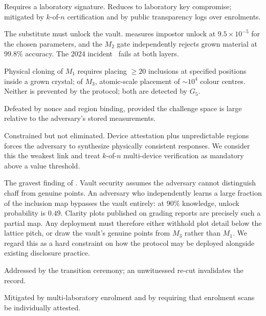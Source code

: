 \documentclass[10pt,twocolumn]{article}
\theoremstyle{remark}
\begin{document}
\begin{description}[leftmargin=1.4em,style=nextline]
\item[$A_1$ Record forgery.] Requires a laboratory signature. Reduces to
laboratory key compromise; mitigated by $k$-of-$n$ certification and by public
transparency logs over enrolments.

\item[$A_2$ Substitution.] The substitute must unlock the vault. 
measures impostor unlock at $9.5\times10^{-5}$ for the chosen parameters, and
the $M_2$ gate independently rejects grown material at $99.8\%$ accuracy. The
2024 incident~\cite{igi2024} fails at both layers.

\item[$A_3$ Cloning.] Physical cloning of $M_1$ requires placing $\geq 20$
inclusions at specified positions inside a grown crystal; of $M_3$, atomic-scale
placement of $\sim 10^4$ colour centres. Neither is prevented by the protocol;
both are detected by $G_5$.

\item[$A_4$ Replay.] Defeated by nonce and region binding, provided the
challenge space is large relative to the adversary's stored measurements.

\item[$A_5$ Oracle compromise.] Constrained but not eliminated. Device
attestation plus unpredictable regions forces the adversary to synthesize
physically consistent responses. We consider this the weakest link and treat
$k$-of-$n$ multi-device verification as mandatory above a value threshold.

\item[$A_6$ Template inversion.] The gravest finding of . Vault
security  assumes the adversary cannot distinguish chaff from
genuine points. An adversary who independently learns a large fraction of the
inclusion map bypasses the vault entirely: at $90\%$ knowledge, unlock
probability is $0.49$. Clarity plots published on grading reports are precisely
such a partial map. Any deployment must therefore either withhold plot detail
below the lattice pitch, or draw the vault's genuine points from $M_3$ rather
than $M_1$. We regard this as a hard constraint on how the protocol may be
deployed alongside existing disclosure practice.

\item[$A_7$ Re-cut laundering.] Addressed by the transition ceremony; an
unwitnessed re-cut invalidates the record.

\item[$A_8$ Enrolment poisoning.] Mitigated by multi-laboratory enrolment and by
requiring that enrolment scans be individually attested.
\end{description}
\end{document}
